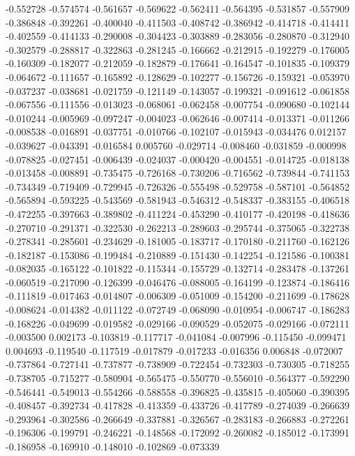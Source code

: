 -0.552728
-0.574574
-0.561657
-0.569622
-0.562411
-0.564395
-0.531857
-0.557909
-0.386848
-0.392261
-0.400040
-0.411503
-0.408742
-0.386942
-0.414718
-0.414411
-0.402559
-0.414133
-0.290008
-0.304423
-0.303889
-0.283056
-0.280870
-0.312940
-0.302579
-0.288817
-0.322863
-0.281245
-0.166662
-0.212915
-0.192279
-0.176005
-0.160309
-0.182077
-0.212059
-0.182879
-0.176641
-0.164547
-0.101835
-0.109379
-0.064672
-0.111657
-0.165892
-0.128629
-0.102277
-0.156726
-0.159321
-0.053970
-0.037237
-0.038681
-0.021759
-0.121149
-0.143057
-0.199321
-0.091612
-0.061858
-0.067556
-0.111556
-0.013023
-0.068061
-0.062458
-0.007754
-0.090680
-0.102144
-0.010244
-0.005969
-0.097247
-0.004023
-0.062646
-0.007414
-0.013371
-0.011266
-0.008538
-0.016891
-0.037751
-0.010766
-0.102107
-0.015943
-0.034476
0.012157
-0.039627
-0.043391
-0.016584
0.005760
-0.029714
-0.008460
-0.031859
-0.000998
-0.078825
-0.027451
-0.006439
-0.024037
-0.000420
-0.004551
-0.014725
-0.018138
-0.013458
-0.008891
-0.735475
-0.726168
-0.730206
-0.716562
-0.739844
-0.741153
-0.734349
-0.719409
-0.729945
-0.726326
-0.555498
-0.529758
-0.587101
-0.564852
-0.565894
-0.593225
-0.543569
-0.581943
-0.546312
-0.548337
-0.383155
-0.406518
-0.472255
-0.397663
-0.389802
-0.411224
-0.453290
-0.410177
-0.420198
-0.418636
-0.270710
-0.291371
-0.322530
-0.262213
-0.289603
-0.295744
-0.375065
-0.322738
-0.278341
-0.285601
-0.234629
-0.181005
-0.183717
-0.170180
-0.211760
-0.162126
-0.182187
-0.153086
-0.199484
-0.210889
-0.151430
-0.142254
-0.121586
-0.100381
-0.082035
-0.165122
-0.101822
-0.115344
-0.155729
-0.132714
-0.283478
-0.137261
-0.060519
-0.217090
-0.126399
-0.046476
-0.088005
-0.164199
-0.123874
-0.186416
-0.111819
-0.017463
-0.014807
-0.006309
-0.051009
-0.154200
-0.211699
-0.178628
-0.008624
-0.014382
-0.011122
-0.072749
-0.068090
-0.010954
-0.006747
-0.186283
-0.168226
-0.049699
-0.019582
-0.029166
-0.090529
-0.052075
-0.029166
-0.072111
-0.003500
0.002173
-0.103819
-0.117717
-0.041084
-0.007996
-0.115450
-0.099471
0.004693
-0.119540
-0.117519
-0.017879
-0.017233
-0.016356
0.006848
-0.072007
-0.737864
-0.727141
-0.737877
-0.738909
-0.722454
-0.732303
-0.730305
-0.718255
-0.738705
-0.715277
-0.580904
-0.565475
-0.550770
-0.556010
-0.564377
-0.592290
-0.546441
-0.549013
-0.554266
-0.588558
-0.396825
-0.435815
-0.405060
-0.390395
-0.408457
-0.392734
-0.417828
-0.413359
-0.433726
-0.417789
-0.274039
-0.266639
-0.293964
-0.302586
-0.266649
-0.337881
-0.326567
-0.283183
-0.266883
-0.272261
-0.196306
-0.199791
-0.246221
-0.148568
-0.172092
-0.260082
-0.185012
-0.173991
-0.186958
-0.169910
-0.148010
-0.102869
-0.073339
